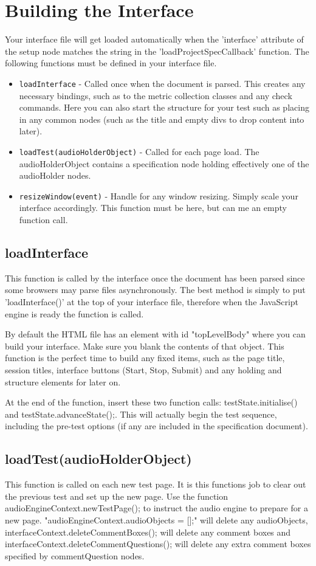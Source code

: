 \documentclass[11pt, oneside]{article}   	%
\begin{document}
\section{Building the Interface}
Your interface file will get loaded automatically when the 'interface' attribute of the setup node matches the string in the 'loadProjectSpecCallback' function. The following functions must be defined in your interface file.
\begin{itemize}
\item \texttt{loadInterface} - Called once when the document is parsed. This creates any necessary bindings, such as to the metric collection classes and any check commands. Here you can also start the structure for your test such as placing in any common nodes (such as the title and empty divs to drop content into later).
\item \texttt{loadTest(audioHolderObject)} - Called for each page load. The audioHolderObject contains a specification node holding effectively one of the audioHolder nodes.
\item \texttt{resizeWindow(event)} - Handle for any window resizing. Simply scale your interface accordingly. This function must be here, but can me an empty function call.
\end{itemize}

\subsection{loadInterface}
This function is called by the interface once the document has been parsed since some browsers may parse files asynchronously. The best method is simply to put 'loadInterface()' at the top of your interface file, therefore when the JavaScript engine is ready the function is called.

By default the HTML file has an element with id "topLevelBody" where you can build your interface. Make sure you blank the contents of that object. This function is the perfect time to build any fixed items, such as the page title, session titles, interface buttons (Start, Stop, Submit) and any holding and structure elements for later on.

At the end of the function, insert these two function calls: testState.initialise() and testState.advanceState();. This will actually begin the test sequence, including the pre-test options (if any are included in the specification document).

\subsection{loadTest(audioHolderObject)}
This function is called on each new test page. It is this functions job to clear out the previous test and set up the new page. Use the function audioEngineContext.newTestPage(); to instruct the audio engine to prepare for a new page. "audioEngineContext.audioObjects = [];" will delete any audioObjects, interfaceContext.deleteCommentBoxes(); will delete any comment boxes and interfaceContext.deleteCommentQuestions(); will delete any extra comment boxes specified by commentQuestion nodes.
\end{document}
